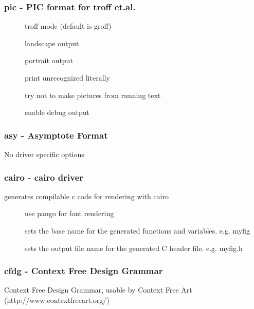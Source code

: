 \documentclass[english,a4paper]{article}
\begin{document}
\subsubsection{pic - PIC format for troff et.al.}
\begin{description}
\item[] 
troff mode (default is groff)


\item[] 
landscape output


\item[] 
portrait output


\item[] 
print unrecognized literally


\item[] 
try not to make pictures from running text


\item[] 
enable debug output


\end{description}
\subsubsection{asy - Asymptote Format}
No driver specific options
\subsubsection{cairo - cairo driver}
generates compilable c code for rendering with cairo

\begin{description}
\item[] 
use pango for font rendering


\item[] 
sets the base name for the generated functions and variables.  e.g. myfig


\item[] 
sets the output file name for the generated C header file.  e.g. myfig.h


\end{description}
\subsubsection{cfdg - Context Free Design Grammar}
Context Free Design Grammar, usable by Context Free Art (http://www.contextfreeart.org/)
\end{document}
